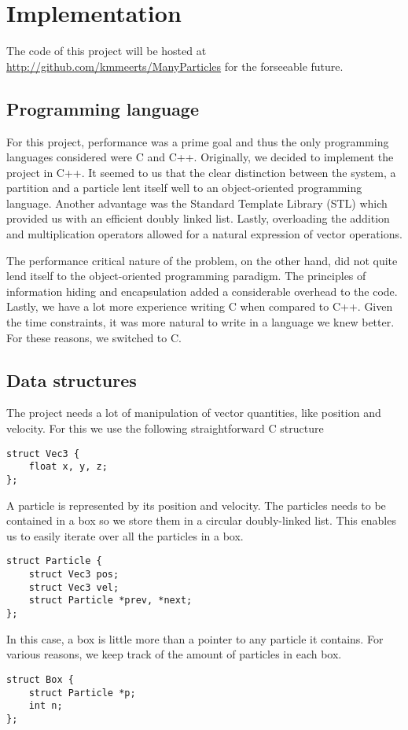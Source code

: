 \section{Implementation}

The code of this project will be hosted at 
\url{http://github.com/kmmeerts/ManyParticles} for the forseeable future.
\subsection{Programming language}
For this project, performance was a prime goal and thus the only programming 
languages considered were C and C++. Originally, we decided to implement the 
project in C++. It seemed to us that the clear distinction between the system, 
a partition and a particle lent itself well to an object-oriented programming 
language. Another advantage was the Standard Template Library (STL) which 
provided us with an efficient doubly linked list. Lastly, overloading the 
addition and multiplication operators allowed for a natural expression of 
vector operations.

The performance critical nature of the problem, on the other hand, did not 
quite lend itself to the object-oriented programming paradigm. The principles 
of information hiding and encapsulation added a considerable overhead to the 
code.  Lastly, we have a lot more experience writing C when compared to C++.  
Given the time constraints, it was more natural to write in a language we knew 
better. For these reasons, we switched to C.


\subsection{Data structures}

The project needs a lot of manipulation of vector quantities, like position 
and velocity. For this we use the following straightforward C structure

\begin{lstlisting}
struct Vec3 {
	float x, y, z;
};
\end{lstlisting}

A particle is represented by its position and velocity. The particles needs 
to be contained in a box so we store them in a circular doubly-linked list. 
This enables us to easily iterate over all the particles in a box.
\begin{lstlisting}
struct Particle {
	struct Vec3 pos;
	struct Vec3 vel;
	struct Particle *prev, *next;
};
\end{lstlisting}
In this case, a box is little more than a pointer to any particle it contains. 
For various reasons, we keep track of the amount of particles in each box.
\begin{lstlisting}
struct Box {
	struct Particle *p;
	int n;
};
\end{lstlisting}

